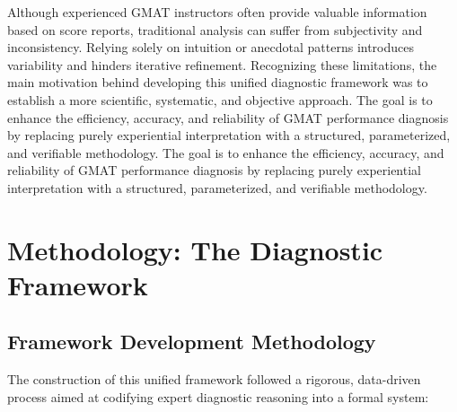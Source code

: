 \documentclass{article}
\begin{document}
Although experienced GMAT instructors often provide valuable information based on score reports, traditional analysis can suffer from subjectivity and inconsistency. Relying solely on intuition or anecdotal patterns introduces variability and hinders iterative refinement. Recognizing these limitations, the main motivation behind developing this unified diagnostic framework was to establish a more scientific, systematic, and objective approach. The goal is to enhance the efficiency, accuracy, and reliability of GMAT performance diagnosis by replacing purely experiential interpretation with a structured, parameterized, and verifiable methodology. The goal is to enhance the efficiency, accuracy, and reliability of GMAT performance diagnosis by replacing purely experiential interpretation with a structured, parameterized, and verifiable methodology.

\section{Methodology: The Diagnostic Framework}

\subsection{Framework Development Methodology}

The construction of this unified framework followed a rigorous, data-driven process aimed at codifying expert diagnostic reasoning into a formal system:
\end{document}

